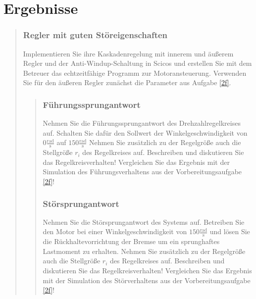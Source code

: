 \section{Ergebnisse}
\begin{quote}
    
    
    \subsubsection{Regler mit guten Störeigenschaften}
    Implementieren Sie ihre Kaskadenregelung mit innerem und äußerem Regler und der
    Anti-Windup-Schaltung in Scicos und erstellen Sie mit dem Betreuer das echtzeitfähige
    Programm zur Motoransteuerung. Verwenden Sie für den äußeren Regler zunächst die
    Parameter aus Aufgabe \ref{2f}.
    
    
    \begin{quote}
        
        \subsubsection{Führungssprungantwort}
        Nehmen Sie die Führungssprungantwort des Drehzahlregelkreises auf. Schalten Sie
        dafür den Sollwert der Winkelgeschwindigkeit von $0 \mathrm{\frac{rad}{s}}$ auf $150 \mathrm{\frac{rad}{s}}$
        Nehmen Sie zusätzlich zu der Regelgröße auch die Stellgröße $r_i$ des Regelkreises auf.
        Beschreiben und diskutieren Sie das Regelkreisverhalten! Vergleichen Sie das Ergebnis mit der Simulation des
        Führungsverhaltens aus der Vorbereitungsaufgabe \ref{2f}!
        
        \begin{quote}
            
            
            
        \end{quote}
        
        
        \subsubsection{Störsprungantwort}
        Nehmen Sie die Störsprungantwort des Systems auf. Betreiben Sie den Motor bei
        einer Winkelgeschwindigkeit von $150 \mathrm{\frac{rad}{s}}$ und lösen Sie die Rückhaltevorrichtung
        der Bremse um ein sprunghaftes Lastmoment zu erhalten. Nehmen Sie zusätzlich zu der Regelgröße auch die Stellgröße
        $r_i$ des Regelkreises auf. Beschreiben und diskutieren Sie das Regelkreisverhalten! Vergleichen Sie das Ergebnis mit der
        Simulation des Störverhaltens aus der Vorbereitungsaufgabe \ref{2f}!
        

\end{quote}
\end{quote}
